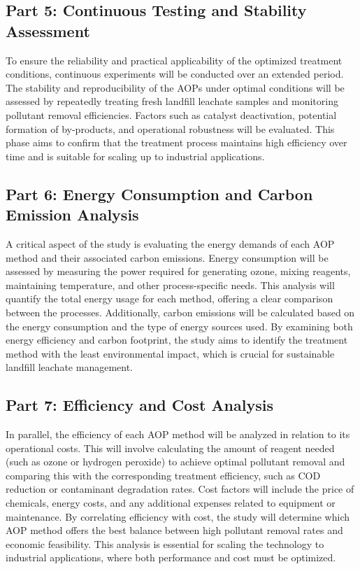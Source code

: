 \documentclass[a4paper]{article}
\begin{document}
\subsection*{Part 5: Continuous Testing and Stability Assessment}

To ensure the reliability and practical applicability of the optimized treatment conditions, continuous experiments will be conducted over an extended period. The stability and reproducibility of the AOPs under optimal conditions will be assessed by repeatedly treating fresh landfill leachate samples and monitoring pollutant removal efficiencies. Factors such as catalyst deactivation, potential formation of by-products, and operational robustness will be evaluated. This phase aims to confirm that the treatment process maintains high efficiency over time and is suitable for scaling up to industrial applications.

\subsection*{Part 6: Energy Consumption and Carbon Emission Analysis}

A critical aspect of the study is evaluating the energy demands of each AOP method and their associated carbon emissions. Energy consumption will be assessed by measuring the power required for generating ozone, mixing reagents, maintaining temperature, and other process-specific needs. This analysis will quantify the total energy usage for each method, offering a clear comparison between the processes. Additionally, carbon emissions will be calculated based on the energy consumption and the type of energy sources used. By examining both energy efficiency and carbon footprint, the study aims to identify the treatment method with the least environmental impact, which is crucial for sustainable landfill leachate management.

\subsection*{Part 7: Efficiency and Cost Analysis}

In parallel, the efficiency of each AOP method will be analyzed in relation to its operational costs. This will involve calculating the amount of reagent needed (such as ozone or hydrogen peroxide) to achieve optimal pollutant removal and comparing this with the corresponding treatment efficiency, such as COD reduction or contaminant degradation rates. Cost factors will include the price of chemicals, energy costs, and any additional expenses related to equipment or maintenance. By correlating efficiency with cost, the study will determine which AOP method offers the best balance between high pollutant removal rates and economic feasibility. This analysis is essential for scaling the technology to industrial applications, where both performance and cost must be optimized.
\end{document}
